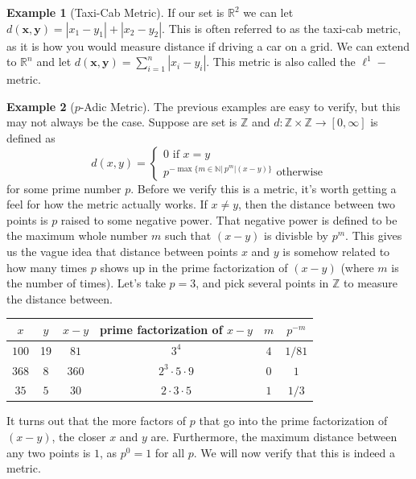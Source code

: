\documentclass{article}
\newcommand{\N}{\mathbb{N}}
\newcommand{\R}{\mathbb{R}}
\newcommand{\Z}{\mathbb{Z}}
\theoremstyle{definition}
\newtheorem{example}{Example}[section]
\begin{document}
\begin{example}[Taxi-Cab Metric]
If our set is $ \R^2 $ we can let $ d(\mathbf{x},\mathbf{y})=|x_1-y_1|+|x_2-y_2| $. This is often referred to as the taxi-cab metric, as it is how you would measure distance if driving a car on a grid. We can extend to $ \R^n $ and let $ d(\mathbf{x},\mathbf{y})=\sum_{i=1}^{n}|x_i-y_i| $. This metric is also called the $ \ell^1 -$metric.    
\end{example}
\begin{example}[$ p $-Adic Metric]
The previous examples are easy to verify, but this may not always be the case. Suppose are set is $ \Z $ and $ d:\Z\times\Z\to[0,\infty] $ is defined as $$ d(x,y)=\begin{cases}
0\text{ if }x=y\\p^{-\max\{m\in\N|\ p^m|(x-y) \}}\text{ otherwise}
\end{cases}$$ for some prime number $ p $. Before we verify this is a metric, it's worth getting a feel for how the metric actually works. If $ x\neq y $, then the distance between two points is $ p $ raised to some negative power. That negative power is defined to be the maximum whole number $ m $ such that $ (x-y) $ is divisble by $ p^m $. This gives us the vague idea that distance between points $ x $ and $ y $ is somehow related to how many times $ p $ shows up in the prime factorization of $ (x-y) $ (where $ m $ is the number of times). Let's take $ p=3 $, and pick several points in $ \Z $ to measure the distance between.    
\begin{center}
\begin{tabular}{cccccc}
	$ x $ & $ y $ & $ x-y $ & prime factorization of $ x-y $ & $ m $ & $ p^{-m} $ \\ \hline
	$ 100 $& 19  &  $ 81 $   &          $ 3^4 $                  &  $ 4 $  &     $ 1/81 $                  \\
$ 368 $	& 8  &  $ 360 $   &            $ 2^3\cdot5\cdot9 $                &  $ 0 $  &  $ 1 $                     \\
$ 35 $	& $ 5 $  &  $ 30 $   &  $ 2\cdot 3\cdot 5 $                           &      $ 1 $ & $ 1/3 $                 
\end{tabular}
\end{center}
It turns out that the more factors of $ p $ that go into the prime factorization of $ (x-y)$, the closer $ x $ and $ y $ are. Furthermore, the maximum distance between any two points is $ 1 $, as $ p^0=1 $ for all $ p $. We will now verify that this is indeed a metric. 
\begin{enumerate}

\end{enumerate}
\end{example}
\end{document}

